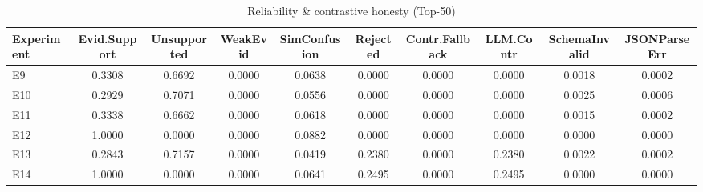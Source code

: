 \begin{table}[t]
\centering
\caption{Reliability & contrastive honesty (Top-50)}
\label{tab:reliab}
\begin{tabular}{lccccccccc}
\toprule
Experiment & Evid.Support & Unsupported & WeakEvid & SimConfusion & Rejected & Contr.Fallback & LLM.Contr & SchemaInvalid & JSONParseErr \\
\midrule
E9 & 0.3308 & 0.6692 & 0.0000 & 0.0638 & 0.0000 & 0.0000 & 0.0000 & 0.0018 & 0.0002 \\
E10 & 0.2929 & 0.7071 & 0.0000 & 0.0556 & 0.0000 & 0.0000 & 0.0000 & 0.0025 & 0.0006 \\
E11 & 0.3338 & 0.6662 & 0.0000 & 0.0618 & 0.0000 & 0.0000 & 0.0000 & 0.0015 & 0.0002 \\
E12 & 1.0000 & 0.0000 & 0.0000 & 0.0882 & 0.0000 & 0.0000 & 0.0000 & 0.0000 & 0.0000 \\
E13 & 0.2843 & 0.7157 & 0.0000 & 0.0419 & 0.2380 & 0.0000 & 0.2380 & 0.0022 & 0.0002 \\
E14 & 1.0000 & 0.0000 & 0.0000 & 0.0641 & 0.2495 & 0.0000 & 0.2495 & 0.0000 & 0.0000 \\
\bottomrule
\end{tabular}
\end{table}
